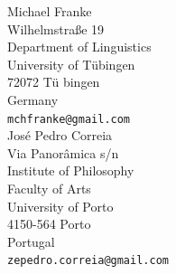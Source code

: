 \documentclass[12pt,english]{article}
\numberwithin{equation}{section}
\begin{document}
\newpage
\begin{flushright}
Michael Franke \\
Wilhelmstra\ss e 19 \\
Department of Linguistics \\
University of T\"ubingen \\
72072 T\"u bingen \\
Germany \\
\texttt{mchfranke@gmail.com} \\
\bigskip
Jos\'e Pedro Correia \\
Via Panorâmica s/n \\
Institute of Philosophy \\
Faculty of Arts \\
University of Porto \\
4150-564 Porto \\
Portugal \\
\texttt{zepedro.correia@gmail.com} \\
\end{flushright}



\end{document}
